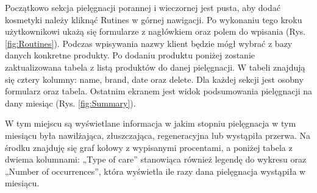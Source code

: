 Początkowo sekcja pielęgnacji porannej i wieczornej jest pusta, aby dodać kosmetyki należy kliknąć Rutines w górnej nawigacji. Po wykonaniu tego kroku użytkownikowi ukażą się formularze z nagłówkiem oraz polem do wpisania (Rys. \ref{fig:Routines}). Podczas wpisywania nazwy klient będzie mógł wybrać z bazy danych konkretne produkty. Po dodaniu produktu poniżej zostanie zaktualizowana tabela z listą produktów do danej pielęgnacji. W tabeli znajdują się cztery kolumny: name, brand, date oraz delete. Dla każdej sekcji jest osobny formularz oraz tabela. Ostatnim ekranem jest widok podsumowania pielęgnacji na dany miesiąc (Rys. \ref{fig:Summary}).

W tym miejscu są wyświetlane informacja w jakim stopniu pielęgnacja w tym miesiącu była nawilżająca, złuszczająca, regeneracyjna lub wystąpiła przerwa. Na środku znajduję się graf kołowy z wypisanymi procentami, a poniżej tabela z dwiema kolumnami: „Type of care” stanowiąca również legendę do wykresu oraz  „Number of occurrences”, która wyświetla ile razy dana pielęgnacja wystąpiła w miesiącu.


